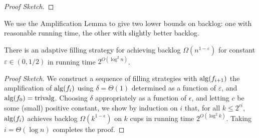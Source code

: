 \begin{proof}[Proof Sketch]

  
\end{proof}

We use the Amplification Lemma to give two lower bounds on
backlog: one with reasonable running time, the other with
slightly better backlog.

\begin{theorem}
  There is an adaptive filling strategy for achieving backlog
  $\Omega(n^{1-\varepsilon})$ for constant $\varepsilon \in (0,
  1/2)$ in running time $2^{O(\log^2 n)}$. 
\end{theorem}
\begin{proof}[Proof Sketch]
  We construct a sequence of filling strategies with $\operatorname{\text{\textup{alg}}}(f_{i+1})$
  the amplification of $\operatorname{\text{\textup{alg}}}(f_i)$ using $\delta = \Theta(1)$
  determined as a function of $\varepsilon$, and $\operatorname{\text{\textup{alg}}}(f_0)=\operatorname{\text{\textup{trivalg}}}$.
  Choosing $\delta$ appropriately as a function of $\epsilon$, and
  letting $c$ be some (small) positive constant, we show by induction
  on $i$ that, for all $k \le 2^{c i}$, $\operatorname{\text{\textup{alg}}}(f_{i})$ achieves backlog
  $\Omega(k^{1 - \epsilon})$ on $k$ cups in running time
  $2^{O(\log^2 k)}$. Taking $i = \Theta(\log n)$ completes the proof.
\end{proof}

